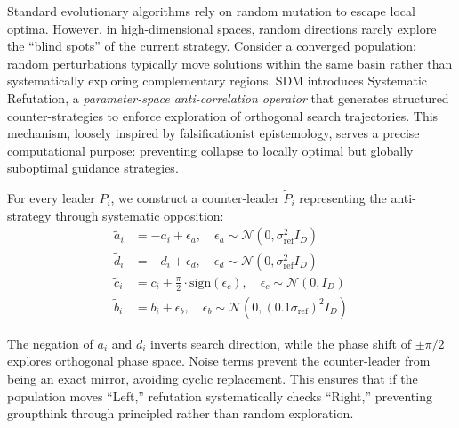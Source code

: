 \documentclass[11pt]{article}
\begin{document}
Standard evolutionary algorithms rely on random mutation to escape local optima. However, in high-dimensional spaces, random directions rarely explore the ``blind spots'' of the current strategy. Consider a converged population: random perturbations typically move solutions within the same basin rather than systematically exploring complementary regions. SDM introduces Systematic Refutation, a \textit{parameter-space anti-correlation operator} that generates structured counter-strategies to enforce exploration of orthogonal search trajectories. This mechanism, loosely inspired by falsificationist epistemology, serves a precise computational purpose: preventing collapse to locally optimal but globally suboptimal guidance strategies.

For every leader $P_i$, we construct a counter-leader $\tilde{P}_i$ representing the anti-strategy through systematic opposition:
\begin{align}
\tilde{a}_i &= -a_i + \epsilon_a, \quad \epsilon_a \sim \mathcal{N}(0, \sigma_{\text{ref}}^2 I_D) \label{eq:counter_a} \\
\tilde{d}_i &= -d_i + \epsilon_d, \quad \epsilon_d \sim \mathcal{N}(0, \sigma_{\text{ref}}^2 I_D) \label{eq:counter_d} \\
\tilde{c}_i &= c_i + \frac{\pi}{2} \cdot \text{sign}(\epsilon_c), \quad \epsilon_c \sim \mathcal{N}(0, I_D) \label{eq:counter_c} \\
\tilde{b}_i &= b_i + \epsilon_b, \quad \epsilon_b \sim \mathcal{N}(0, (0.1 \sigma_{\text{ref}})^2 I_D) \label{eq:counter_b}
\end{align}

The negation of $a_i$ and $d_i$ inverts search direction, while the phase shift of $\pm\pi/2$ explores orthogonal phase space. Noise terms prevent the counter-leader from being an exact mirror, avoiding cyclic replacement. This ensures that if the population moves ``Left,'' refutation systematically checks ``Right,'' preventing groupthink through principled rather than random exploration.
\end{document}
